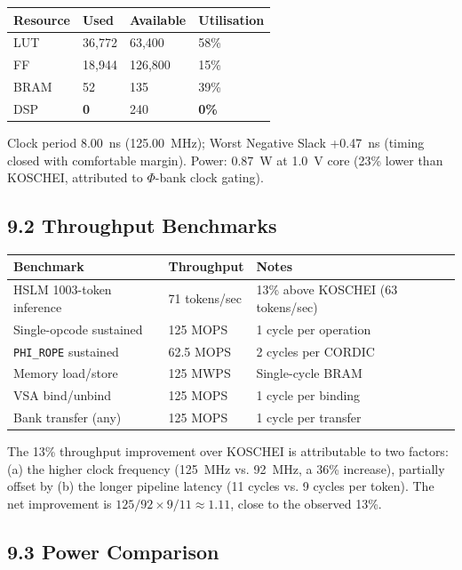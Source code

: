 \begin{longtable}[]{@{}llll@{}}
\toprule\noalign{}
Resource & Used & Available & Utilisation \\
\midrule\noalign{}
\endhead
\bottomrule\noalign{}
\endlastfoot
LUT & 36,772 & 63,400 & 58\% \\
FF & 18,944 & 126,800 & 15\% \\
BRAM & 52 & 135 & 39\% \\
DSP & \textbf{0} & 240 & \textbf{0\%} \\
\end{longtable}

Clock period 8.00~ns (125.00~MHz); Worst Negative Slack +0.47~ns
(timing closed with comfortable margin). Power: 0.87~W at 1.0~V
core (23\% lower than KOSCHEI, attributed to $\Phi$-bank clock
gating).

\subsection{9.2 Throughput Benchmarks}\label{fa_71:throughput}

\begin{longtable}[]{@{}llp{5cm}@{}}
\toprule\noalign{}
Benchmark & Throughput & Notes \\
\midrule\noalign{}
\endhead
\bottomrule\noalign{}
\endlastfoot
HSLM 1003-token inference & 71 tokens/sec & 13\% above KOSCHEI (63 tokens/sec) \\
Single-opcode sustained & 125 MOPS & 1 cycle per operation \\
\texttt{PHI\_ROPE} sustained & 62.5 MOPS & 2 cycles per CORDIC \\
Memory load/store & 125 MWPS & Single-cycle BRAM \\
VSA bind/unbind & 125 MOPS & 1 cycle per binding \\
Bank transfer (any) & 125 MOPS & 1 cycle per transfer \\
\end{longtable}

The 13\% throughput improvement over KOSCHEI is attributable to
two factors: (a) the higher clock frequency (125~MHz vs. 92~MHz,
a 36\% increase), partially offset by (b) the longer pipeline
latency (11 cycles vs. 9 cycles per token). The net improvement
is \(125/92 \times 9/11 \approx 1.11\), close to the observed
13\%.

\subsection{9.3 Power Comparison}\label{fa_71:power-comparison}


